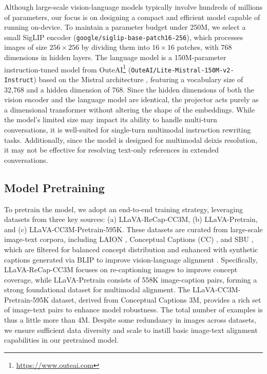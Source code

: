 Although large-scale vision-language models typically involve hundreds of millions of parameters, our focus is on designing a compact and efficient model capable of running on-device. To maintain a parameter budget under 250M, we select a small SigLIP encoder \cite{zhai2023sigmoid} (\texttt{google/siglip-base-patch16-256}), which processes images of size $256 \times 256$ by dividing them into $16 \times 16$ patches, with 768 dimensions in hidden layers. The language model is a 150M-parameter instruction-tuned model from OuteAI\footnote{\url{https://www.outeai.com}} (\texttt{OuteAI/Lite-Mistral-150M-v2-Instruct}) based on the Mistral architecture \cite{jiang2023mistral}, featuring a vocabulary size of 32,768 and a hidden dimension of 768. Since the hidden dimensions of both the vision encoder and the language model are identical, the projector acts purely as a dimensional transformer without altering the shape of the embeddings. While the model's limited size may impact its ability to handle multi-turn conversations, it is well-suited for single-turn multimodal instruction rewriting tasks. Additionally, since the model is designed for multimodal deixis resolution, it may not be effective for resolving text-only references in extended conversations\cite{ates2023marrs}.  

\subsection{Model Pretraining}

To pretrain the model, we adopt an end-to-end training strategy, leveraging datasets from three key sources: (a) LLaVA-ReCap-CC3M, (b) LLaVA-Pretrain, and (c) LLaVA-CC3M-Pretrain-595K. These datasets are curated from large-scale image-text corpora, including LAION \cite{schuhmann2021laion400mopendatasetclipfiltered}, Conceptual Captions (CC) \cite{sharma-etal-2018-conceptual}, and SBU \cite{NIPS2011_5dd9db5e}, which are filtered for balanced concept distribution and enhanced with synthetic captions generated via BLIP to improve vision-language alignment \cite{lmms2023llava, liu2023pretrain, liu2023cc3m}. Specifically, LLaVA-ReCap-CC3M focuses on re-captioning images to improve concept coverage, while LLaVA-Pretrain consists of 558K image-caption pairs, forming a strong foundational dataset for multimodal alignment. The LLaVA-CC3M-Pretrain-595K dataset, derived from Conceptual Captions 3M, provides a rich set of image-text pairs to enhance model robustness. The total number of examples is thus a little more than 4M. Despite some redundancy in images across datasets, we ensure sufficient data diversity and scale to instill basic image-text alignment capabilities in our pretrained model.  

